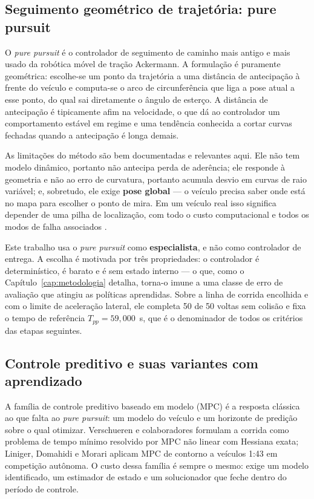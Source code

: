 \subsection{Seguimento geométrico de trajetória: pure pursuit}

O \textit{pure pursuit} \cite{Coulter1992PurePursuit} é o controlador de
seguimento de caminho mais antigo e mais usado da robótica móvel de tração
Ackermann. A formulação é puramente geométrica: escolhe-se um ponto da
trajetória a uma distância de antecipação à frente do veículo e computa-se o
arco de circunferência que liga a pose atual a esse ponto, do qual sai
diretamente o ângulo de esterço. A distância de antecipação é tipicamente afim
na velocidade, o que dá ao controlador um comportamento estável em regime e uma
tendência conhecida a cortar curvas fechadas quando a antecipação é longa
demais.

As limitações do método são bem documentadas e relevantes aqui. Ele não tem
modelo dinâmico, portanto não antecipa perda de aderência; ele responde à
geometria e não ao erro de curvatura, portanto acumula desvio em curvas de raio
variável; e, sobretudo, ele exige \textbf{pose global} --- o veículo precisa
saber onde está no mapa para escolher o ponto de mira. Em um veículo real isso
significa depender de uma pilha de localização, com todo o custo computacional e
todos os modos de falha associados \cite{fox2003adapting, thrun2005}.

Este trabalho usa o \textit{pure pursuit} como \textbf{especialista}, e não como
controlador de entrega. A escolha é motivada por três propriedades: o
controlador é determinístico, é barato e é sem estado interno --- o que, como o
Capítulo~\ref{cap:metodologia} detalha, torna-o imune a uma classe de erro de
avaliação que atingiu as políticas aprendidas. Sobre a linha de corrida
encolhida e com o limite de aceleração lateral, ele completa 50 de 50 voltas sem
colisão e fixa o tempo de referência $T_{pp} = 59{,}000$~s, que é o denominador
de todos os critérios das etapas seguintes.

\subsection{Controle preditivo e suas variantes com aprendizado}

A família de controle preditivo baseado em modelo (MPC) é a resposta clássica ao
que falta ao \textit{pure pursuit}: um modelo do veículo e um horizonte de
predição sobre o qual otimizar. Verschueren e colaboradores
\cite{verschueren2016time} formulam a corrida como problema de tempo mínimo
resolvido por MPC não linear com Hessiana exata; Liniger, Domahidi e Morari
\cite{Liniger2015Optimization} aplicam MPC de contorno a veículos 1:43 em
competição autônoma. O custo dessa família é sempre o mesmo: exige um modelo
identificado, um estimador de estado e um solucionador que feche dentro do
período de controle.

